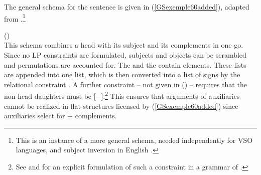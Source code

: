 The general schema for the sentence is given in (\ref{GSexemple60added}), adapted from
.\footnote{This is an instance of a more general schema, needed independently
  for VSO languages, and subject inversion in English \parencites[]{ps2}[231--232]{GSag2000a-u}.}

\ea
\label{GSexemple60added}
 () \impl \\
\z
This schema combines a head with its subject and its complements in one go. Since no LP constraints
are formulated, subjects and objects can be scrambled and permutations are accounted for. The \subjl and the
\compsl contain  elements. These lists are appended into one list, which is then
converted into a list of signs by the
relational constraint . A further constraint -- not given in () -- requires that the
non-head daughters must be [\light{}$-$].\footnote{%
  See \citet[]{Mueller2005c} and \citet[Section~2.2.4]{MuellerGS} for an explicit formulation of
  such a constraint in a grammar of .
} This ensures that arguments of auxiliaries cannot be realized
in flat structures licensed by (\ref{GSexemple60added}) since auxiliaries select for \light{}$+$
complements. 

